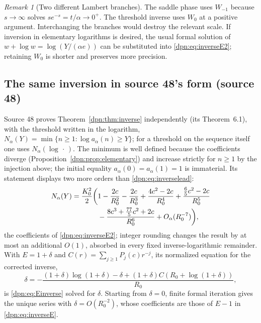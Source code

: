 \documentclass[11pt]{article}
\numberwithin{equation}{section}
\theoremstyle{definition}\newtheorem{definition}[theorem]{Definition}
\theoremstyle{remark}\newtheorem{remark}[theorem]{Remark}
\newcommand{\src}[1]{\textup{(source #1)}}
\begin{document}
\begin{remark}[Two different Lambert branches]
The saddle phase uses $W_{-1}$ because $s\to\infty$ solves
$se^{-s}=t/\alpha\to0^+$. The threshold inverse uses $W_0$ at a positive
argument. Interchanging the branches would destroy the relevant scale.
If inversion in elementary logarithms is desired, the usual formal solution
of $w+\log w=\log(Y/(\alpha e))$ can be substituted into
\eqref{dpn:eq:inverseE2}; retaining $W_0$ is shorter and preserves more precision.
\end{remark}

\subsection{The same inversion in source 48's form \src{48}}
Source 48 proves Theorem~\ref{dpn:thm:inverse} independently (its
Theorem~6.1), with the threshold written in the logarithm,
$N_\alpha(Y)=\min\{n\ge1:\log a_\alpha(n)\ge Y\}$; for a threshold on the
sequence itself one uses $N_\alpha(\log\,\cdot\,)$.  The minimum is well
defined because the coefficients diverge (Proposition~\ref{dpn:prop:elementary})
and increase strictly for $n\ge1$ by the injection above; the initial equality
$a_\alpha(0)=a_\alpha(1)=1$ is immaterial.  Its statement displays two more
orders than \eqref{dpn:eq:inverselead}:
\begin{align}
 N_\alpha(Y)=\frac{K_0^2}{2}\bigg(&1-\frac{2c}{R_0^2}
                       -\frac{2c}{R_0^3}
                       +\frac{4c^2-2c}{R_0^4}
                       +\frac{\tfrac65c^2-2c}{R_0^5}\notag\\
                       &-\frac{8c^3+\tfrac{77}{5}c^2+2c}{R_0^6}
                       +O_\alpha(R_0^{-7})\bigg),\label{dpn:48:eq:inversefull}
\end{align}
the coefficients of \eqref{dpn:eq:inverseE2}; integer rounding changes the
result by at most an additional $O(1)$, absorbed in every fixed
inverse-logarithmic remainder.  With $E=1+\delta$ and
$C(r)=\sum_{j\ge1}P_j(c)r^{-j}$, its normalized equation for the corrected
inverse,
\begin{equation}\label{dpn:48:eq:inversefixed}
 \boxed{\displaystyle
 \delta=-\frac{(1+\delta)\log(1+\delta)-\delta
           +(1+\delta)C(R_0+\log(1+\delta))}{R_0},}
\end{equation}
is \eqref{dpn:eq:Einverse} solved for $\delta$.  Starting from $\delta=0$,
finite formal iteration gives the unique series with $\delta=O(R_0^{-2})$,
whose coefficients are those of $E-1$ in \eqref{dpn:eq:inverseE}.
\end{document}
